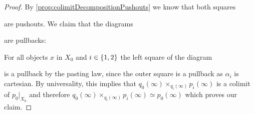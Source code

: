 \begin{lemma}
\begin{proof}
        By \cref{prop:colimitDecompositionPushouts} we know that both squares
        \begin{center}
        \end{center}
        are pushouts.
        We claim that the diagrams
        \begin{center}
        \end{center}
        are pullbacks: 

        For all objects $x$ in $X_0$ and $i\in\left\lbrace1,2\right\rbrace$ the left square of the diagram 
        \begin{center}
        \end{center}
        is a pullback by the pasting law, since the outer square is a pullback as $\alpha_i$ is cartesian.
        By universality, this implies that $q_0(\infty)\times_{q_i(\infty)}p_i(\infty)$ is a colimit of $p_0|_{X_0}$ and therefore $q_0(\infty)\times_{q_i(\infty)}p_i(\infty)\simeq p_0(\infty)$ which proves our claim.


\end{proof}
\end{lemma}
